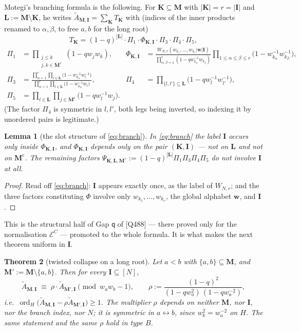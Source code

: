 \documentclass[11pt]{article}
\theoremstyle{plain}
\newtheorem{thm}{Theorem}
\newtheorem{lem}[thm]{Lemma}
\theoremstyle{definition}
\theoremstyle{remark}
\theoremstyle{plain}
\newcommand{\bI}{\mathbf{I}}
\newcommand{\bM}{\mathbf{M}}
\newcommand{\bK}{\mathbf{K}}
\newcommand{\bL}{\mathbf{L}}
\newcommand{\bw}{\mathbf{w}}
\newcommand{\At}{\widetilde{A}}
\newcommand{\ord}{\operatorname{ord}}
\begin{document}
Motegi's branching formula is the following.  For $\bK\subseteq\bM$ with
$|\bK|=r=|\bI|$ and $\bL:=\bM\setminus\bK$, he writes
$\At_{\bM,\bI}=\sum_{\bK}T_{\bK}$ with (indices of the inner products renamed
to $\alpha,\beta$, to free $a,b$ for the long root)
\begin{equation}
T_{\bK}=(1-q)^{|\bL|}\cdot\Pi_1\cdot\Phi_{\bK,\bI}\cdot\Pi_3\cdot\Pi_4\cdot\Pi_5,
\label{eq:branch}
\end{equation}
\begin{align*}
\Pi_1&=\prod_{\substack{j\le k\\ j,k\in\bM^{\mathrm c}}}(1-qw_jw_k),
&
\Phi_{\bK,\bI}&=
\frac{W_{N,r}(w_{k_1},\dots,w_{k_r}|\bw|\bI)}
     {\prod_{\alpha,\beta=1}^{r}(1-qw_{k_\alpha}^{-1}w_{k_\beta})}
\prod_{1\le\alpha\le\beta\le r}\!\!\bigl(1-w_{k_\alpha}^{-1}w_{k_\beta}^{-1}\bigr),
\\
\Pi_3&=\frac{\prod_{\alpha=1}^{r}\prod_{l\in\bL}\bigl(1-w_{k_\alpha}^{-1}w_{l}^{-1}\bigr)}
            {\prod_{\alpha=1}^{r}\prod_{l\in\bL}\bigl(1-w_{k_\alpha}^{-1}w_{l}\bigr)},
&
\Pi_4&=\prod_{\{l,l'\}\subseteq\bL}\bigl(1-qw_{l}^{-1}w_{l'}^{-1}\bigr),
\\
\Pi_5&=\prod_{l\in\bL}\prod_{j\in\bM^{\mathrm c}}\bigl(1-qw_{l}^{-1}w_j\bigr).
\end{align*}
(The factor $\Pi_4$ is symmetric in $l,l'$, both legs being inverted, so
indexing it by unordered pairs is legitimate.)

\begin{lem}[the slot structure of \eqref{eq:branch}]\label{lem:slots}
In \eqref{eq:branch} the label $\bI$ occurs only inside $\Phi_{\bK,\bI}$, and
$\Phi_{\bK,\bI}$ depends only on the pair $(\bK,\bI)$ --- not on $\bL$ and not
on $\bM^{\mathrm c}$.  The remaining factors
$\Psi_{\bK,\bL,\bM^{\mathrm c}}:=(1-q)^{|\bL|}\Pi_1\Pi_3\Pi_4\Pi_5$ do not
involve $\bI$ at all.
\end{lem}
\begin{proof}
Read off \eqref{eq:branch}: $\bI$ appears exactly once, as the label of
$W_{N,r}$; and the three factors constituting $\Phi$ involve only
$w_{k_1},\dots,w_{k_r}$, the global alphabet $\bw$, and $\bI$.
\end{proof}

This is the structural half of Gap \texttt{q} of [Q488] --- there proved only
for the normalisation $\mathcal{E}^C$ --- promoted to the whole formula.  It is
what makes the next theorem uniform in $\bI$.

\begin{thm}[twisted collapse on a long root]\label{thm:collapse}
Let $a<b$ with $\{a,b\}\subseteq\bM$, and $\bM':=\bM\setminus\{a,b\}$.  Then
for \emph{every} $\bI\subseteq[N]$,
\begin{equation}
\At_{\bM,\bI}\;\equiv\;\rho\cdot\At_{\bM',\bI}
\pmod{w_aw_b-1},
\qquad
\rho:=\frac{(1-q)^2}{(1-qw_a^2)\,(1-qw_a^{-2})},
\label{eq:collapse}
\end{equation}
i.e.\ $\ord_H\bigl(\At_{\bM,\bI}-\rho\At_{\bM',\bI}\bigr)\ge1$.  The multiplier
$\rho$ depends on neither $\bM$, nor $\bI$, nor the branch index, nor $N$; it
is symmetric in $a\leftrightarrow b$, since $w_b^2=w_a^{-2}$ on $H$.  The same
statement and the same $\rho$ hold in type $B$.
\end{thm}
\end{document}
